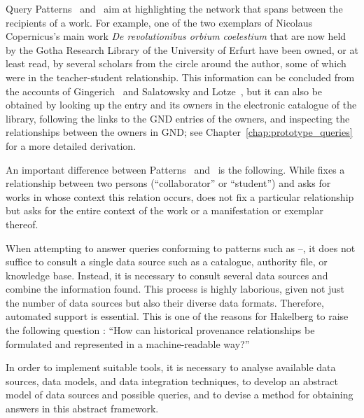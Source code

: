 Query Patterns~ and~
aim at highlighting the network
that spans between the recipients of a work.
For example, one of the two exemplars of Nicolaus Copernicus's
main work \emph{De revolutionibus orbium coelestium} \autocite{Kopernikus1543}
that are now held by the Gotha Research Library of the University of Erfurt
have been owned, or at least read, by several scholars
from the circle around the author,
some of which were in the teacher-student relationship.
This information can be concluded
from the accounts of Gingerich~\autocite[p.\,69]{Gingerich2002}
and Salatowsky and Lotze~\autocite[p.\,142]{Salatowsky2015},
but it can also be obtained by looking up the entry and its owners in the electronic catalogue of the library,
following the links to the GND entries of the owners,
and inspecting the relationships between the owners in GND;
see Chapter~\ref{chap:prototype_queries} for a more detailed derivation.

An important difference between Patterns~ and~ is the following.
While  fixes a relationship between two persons (\enquote{collaborator} or \enquote{student})
and asks for works in whose context this relation occurs,
 does not fix a particular relationship but asks for the entire context of
the work or a manifestation or exemplar thereof.

When attempting to answer queries conforming to patterns such as --,
it does not suffice to consult a single data source such as
a catalogue, authority file, or knowledge base.
Instead, it is necessary to consult several data sources
and combine the information found. This process is highly laborious,
given not just the number of data sources but also their diverse
data formats. Therefore, automated support is essential.
This is one of the reasons for Hakelberg
to raise the following question \autocite[p.\,46, translated from German]{Hakelberg2016}:
\enquote{How can historical provenance relationships be formulated and represented
in a machine-readable way?}

In order to implement suitable tools,
it is necessary to analyse available data sources, data models, and data integration techniques,
to develop an abstract model of data sources and possible queries,
and to devise a method for obtaining answers in this abstract framework.

